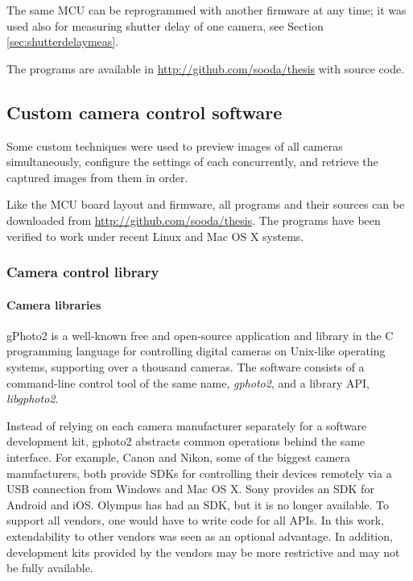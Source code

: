 The same MCU can be reprogrammed with another firmware at any time; it was used also for measuring shutter delay of one camera, see Section \ref{sec:shutterdelaymeas}.

The programs are available in \url {http://github.com/sooda/thesis} with source code.


\subsection{Custom camera control software} %



Some custom techniques were used to preview images of all cameras simultaneously, configure the settings of each concurrently, and retrieve the captured images from them in order.

Like the MCU board layout and firmware, all programs and their sources can be downloaded from \url {http://github.com/sooda/thesis}.
The programs have been verified to work under recent Linux and Mac OS X systems.


\subsubsection{Camera control library} %

\paragraph{Camera libraries}
gPhoto2 \cite{gphoto2} is a well-known free and open-source application and library in the C programming language for controlling digital cameras on Unix-like operating systems, supporting over a thousand cameras.
The software consists of a command-line control tool of the same name, \emph{gphoto2}, and a library API, \emph{libgphoto2}.

Instead of relying on each camera manufacturer separately for a software development kit, gphoto2 abstracts common operations behind the same interface.
For example, Canon and Nikon, some of the biggest camera manufacturers, both provide SDKs for controlling their devices remotely via a USB connection from Windows and Mac OS X. \cite{canonedsdk} \cite{nikonsdk}
Sony provides an SDK for Android and iOS. \cite{sonysdk}
Olympus has had an SDK, but it is no longer available. \cite{olympussdk}
To support all vendors, one would have to write code for all APIs.
In this work, extendability to other vendors was seen as an optional advantage.
In addition, development kits provided by the vendors may be more restrictive and may not be fully available.

